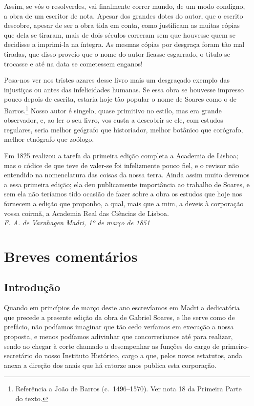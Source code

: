 Assim, se vós o resolverdes, vai finalmente correr mundo, de um 
modo condigno, a obra de um escritor de nota. Apesar dos
grandes dotes do autor, que o escrito descobre, apesar de ser a obra tida 
em conta, como justificam as muitas cópias que dela se tiraram, mais de 
dois séculos correram sem que houvesse quem se decidisse a imprimi-la 
na íntegra. As mesmas cópias por desgraça foram tão mal tiradas, que 
disso proveio que o nome do autor ficasse esgarrado, o título se trocasse 
e até na data se cometessem enganos!

Pesa-nos ver nos tristes azares desse livro mais um desgraçado 
exemplo das injustiças ou antes das infelicidades humanas. Se essa obra 
se houvesse impresso pouco depois de escrita, estaria hoje tão popular o 
nome de Soares como o de Barros.\footnote{ Referência a João de Barros (c.~1496--1570). 
Ver nota 18 da Primeira Parte do texto.} Nosso autor é singelo, quase 
primitivo no estilo, mas era grande observador, e, ao ler o seu livro, vos 
custa a descobrir se ele, com estudos regulares, seria melhor geógrafo 
que historiador, melhor botânico que corógrafo, melhor etnógrafo que zoólogo.

Em 1825 realizou a tarefa da primeira edição completa a Academia 
de Lisboa; mas o códice de que teve de valer-se foi infelizmente pouco 
fiel, e o revisor não entendido na nomenclatura das coisas da nossa terra. 
Ainda assim muito devemos a essa primeira edição; ela deu 
publicamente importância ao trabalho de Soares, e sem ela não teríamos 
tido ocasião de fazer sobre a obra os estudos que hoje nos fornecem a 
edição que proponho, a qual, mais que a mim, a deveis à corporação 
vossa coirmã, a Academia Real das Ciências de Lisboa.\\

\noindent\textit{F. A. de Varnhagen}  \textit{Madri, 1º de março de 1851}\\

\chapter[Breves comentários]{Breves comentários }

\section{Introdução}
\noindent Quando em princípios de março deste ano escrevíamos em Madri a 
dedicatória que precede a presente edição da obra de Gabriel Soares, e 
lhe serve como de prefácio, não podíamos imaginar que tão cedo 
veríamos em execução a nossa proposta, e menos podíamos adivinhar 
que concorreríamos até para realizar, sendo ao chegar à corte chamado a 
desempenhar as funções do cargo de primeiro-secretário do nosso 
Instituto Histórico, cargo a que, pelos novos estatutos, anda anexa a 
direção dos anais que há catorze anos publica esta corporação.

